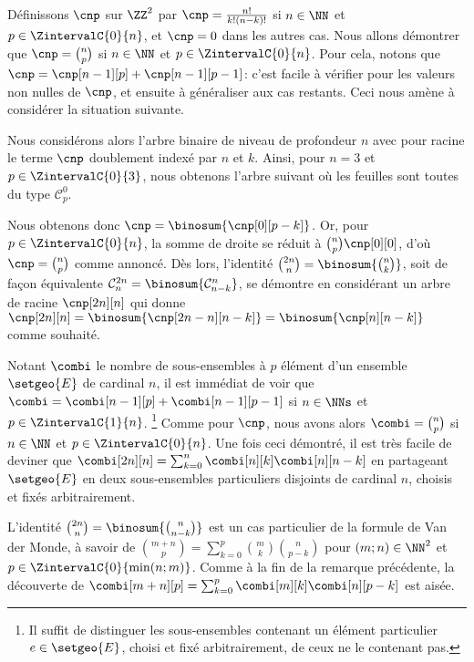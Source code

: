 Définissons $\cnp$ sur $\ZZ^2$ par
$\cnp = \frac{n!}{k!(n-k)!}$ si $n \in \NN$ et $p \in \ZintervalC{0}{n}$,
et
$\cnp = 0$ dans les autres cas.
%
Nous allons démontrer que $\cnp = \binom{n}{p}$ si $n \in \NN$ et $p \in \ZintervalC{0}{n}$.
%
Pour cela, notons que $\cnp = \cnp[n-1][p] + \cnp[n-1][p-1]$:
c'est facile à vérifier pour les valeurs non nulles de $\cnp$, et ensuite à généraliser aux cas restants.
Ceci nous amène à considérer la situation suivante.

\explaintree{\cnp}{\cnp[n-1][p]}{\cnp[n-1][p-1]}%
            {\factobinomintertree}{}

Nous considérons alors l'arbre binaire de niveau de profondeur $n$ avec pour racine le terme $\cnp$ doublement indexé par $n$ et $k$.
Ainsi, pour $n=3$ et $p \in \ZintervalC{0}{3}$, nous obtenons l'arbre suivant où les feuilles sont toutes du type $\mathcal{C}^0_p$.


Nous obtenons donc
$\cnp = \binosum{\cnp[0][p-k]}$.
Or, pour $p \in \ZintervalC{0}{n}$, la somme de droite se réduit à $\binom{n}{p} \cnp[0][0]$, d'où $\cnp = \binom{n}{p}$ comme annoncé.
%
Dès lors, l'identité
$\binom{2n}{n} = \binosum{\binom{n}{k}}$,
soit de façon équivalente
$\mathcal{C}^{2n}_n = \binosum{\mathcal{C}^n_{n-k}}$,
se démontre en considérant un arbre de racine $\cnp[2n][n]$ qui donne
$\cnp[2n][n] = \binosum{\cnp[2n - n][n-k]} = \binosum{\cnp[n][n-k]}$
comme souhaité.


\begin{remark}
	Notant $\combi$ le nombre de sous-ensembles à $p$ élément d'un ensemble $\setgeo{E}$ de cardinal $n$, il est immédiat de voir que
	$\combi = \combi[n-1][p] + \combi[n-1][p-1]$ si $n \in \NNs$ et $p \in \ZintervalC{1}{n}$.%
	\footnote{
		Il suffit de distinguer les sous-ensembles contenant un élément particulier $e \in \setgeo{E}$, choisi et fixé arbitrairement, de ceux ne le contenant pas.
	}
	Comme pour $\cnp$, nous avons alors $\combi = \binom{n}{p}$ si $n \in \NN$ et $p \in \ZintervalC{0}{n}$.
	Une fois ceci démontré, il est très facile de deviner que 
	$\combi[2n][n] = \sum_{k=0}^{n} \combi[n][k] \combi[n][n-k]$
	en partageant $\setgeo{E}$ en deux sous-ensembles particuliers disjoints de cardinal $n$, choisis et fixés arbitrairement.
\end{remark}


\begin{remark}
	L'identité 
	$\binom{2n}{n} = \binosum{\binom{n}{n-k}}$
	est un cas particulier de la formule de Van der Monde, à savoir de
	$\binom{m + n}{p} = \sum_{k=0}^p \binom{m}{k} \binom{n}{p-k}$
	pour $(m ; n) \in \NN^2$ et $p \in \ZintervalC{0}{\min(n ; m)}$.
	Comme à la fin de la remarque précédente, la découverte de
	$\combi[m + n][p] = \sum_{k=0}^p \combi[m][k] \combi[n][p-k]$
	est aisée. 
\end{remark}




